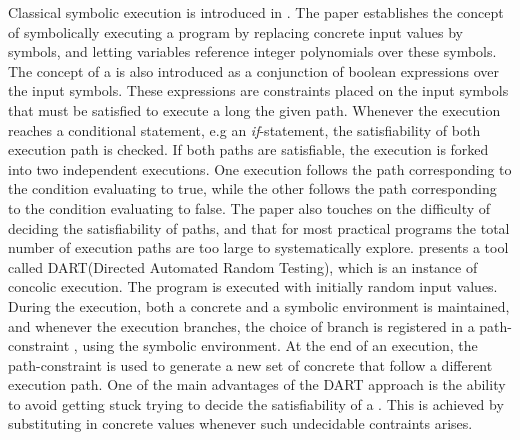 Classical symbolic execution is introduced in \citep{King76}. The paper establishes the concept of symbolically executing a program by replacing concrete input values by symbols, and letting variables reference integer polynomials over these symbols. The concept of a \pc is also introduced as a conjunction of boolean expressions over the input symbols. These expressions are constraints placed on the input symbols that must be satisfied to execute a long the given path. Whenever the execution reaches a conditional statement, e.g an \textsl{if}-statement, the satisfiability of both execution path is checked. If both paths are satisfiable, the execution is forked into two independent executions. One execution follows the path corresponding to the condition evaluating to true, while the other follows the path corresponding to the condition evaluating to false. The paper also touches on the difficulty of deciding the satisfiability of paths, and that for most practical programs the total number of execution paths are too large to systematically explore. \citep{Godefroid:2005:DDA:1064978.1065036} presents a tool called DART(Directed Automated Random Testing), which is an instance of concolic execution. The program is executed with initially random input values. During the execution, both a concrete and a symbolic environment is maintained, and whenever the execution branches, the choice of branch is registered in a path-constraint , using the symbolic environment. At the end of an execution, the path-constraint is used to generate a new set of concrete that follow a different execution path. One of the main advantages of the DART approach is the ability to avoid getting stuck trying to decide the satisfiability of a \pc. This is achieved by substituting in concrete values whenever such undecidable contraints arises. 

